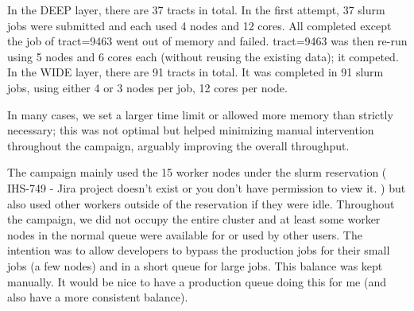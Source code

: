 In the DEEP layer, there are 37 tracts in total. In the first attempt, 37 slurm jobs were submitted and each used 4 nodes and 12 cores. All completed except the job of tract=9463 went out of memory and failed. tract=9463 was then re-run using 5 nodes and 6 cores each (without reusing the existing data); it competed.  In the WIDE layer, there are 91 tracts in total. It was completed in 91 slurm jobs, using either 4 or 3 nodes per job, 12 cores per node.

In many cases, we set a larger time limit or allowed more memory than strictly necessary; this was not optimal but helped minimizing manual intervention throughout the campaign, arguably improving the overall throughput.

The campaign mainly used the 15 worker nodes under the slurm reservation ( IHS-749 - Jira project doesn't exist or you don't have permission to view it. ) but also used other workers outside of the reservation if they were idle.  Throughout the campaign, we did not occupy the entire cluster and at least some worker nodes in the normal queue were available for or used by other users. The intention was to allow developers to bypass the production jobs for their small jobs (a few nodes) and in a short queue for large jobs. This balance was kept manually.  It would be nice to have a production queue doing this for me (and also have a more consistent balance).
